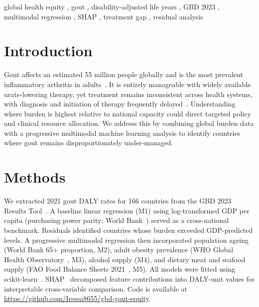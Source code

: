 \documentclass[]{ceurart}
\begin{document}
\begin{keywords}
  global health equity \sep
  gout \sep
  disability-adjusted life years \sep
  GBD 2023 \sep
  multimodal regression \sep
  SHAP \sep
  treatment gap \sep
  residual analysis
\end{keywords}

\maketitle

\section{Introduction}

Gout affects an estimated 55 million people globally and is the most prevalent
inflammatory arthritis in adults~\cite{gbd2023gout}. It is entirely
manageable with widely available urate-lowering therapy, yet treatment remains
inconsistent across health systems, with diagnosis and initiation of therapy
frequently delayed~\cite{dalbeth2016}. Understanding where burden is highest
relative to national capacity could direct targeted policy and clinical
resource allocation. We address this by combining global burden data with a
progressive multimodal machine learning analysis to identify countries where
gout remains disproportionately under-managed.

\section{Methods}

We extracted 2021 gout DALY rates for 166 countries from the GBD 2023 Results
Tool~\cite{gbd2023gout}. A baseline linear regression (M1) using log-transformed
GDP per capita (purchasing power parity; World Bank~\cite{worldbank}) served as
a cross-national benchmark. Residuals identified countries whose burden
exceeded GDP-predicted levels. A progressive multimodal regression then
incorporated population ageing (World Bank 65+ proportion, M2), adult obesity
prevalence (WHO Global Health Observatory~\cite{who_gho}, M3), alcohol supply
(M4), and dietary meat and seafood supply (FAO Food Balance Sheets
2021~\cite{fao_fbs}, M5). All models were fitted using
scikit-learn~\cite{sklearn}. SHAP~\cite{lundberg2017} decomposed feature
contributions into DALY-unit values for interpretable cross-variable
comparison. Code is available at
\url{https://github.com/Iressa8655/gbd-gout-equity}.
\end{document}
